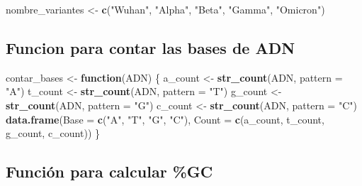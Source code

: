 \documentclass[
]{article}
\newenvironment{Shaded}{\begin{snugshade}}{\end{snugshade}}
\newcommand{\AttributeTok}[1]{\textcolor[rgb]{0.13,0.29,0.53}{#1}}
\newcommand{\ControlFlowTok}[1]{\textcolor[rgb]{0.13,0.29,0.53}{\textbf{#1}}}
\newcommand{\FunctionTok}[1]{\textcolor[rgb]{0.13,0.29,0.53}{\textbf{#1}}}
\newcommand{\NormalTok}[1]{#1}
\newcommand{\OtherTok}[1]{\textcolor[rgb]{0.56,0.35,0.01}{#1}}
\newcommand{\StringTok}[1]{\textcolor[rgb]{0.31,0.60,0.02}{#1}}
\begin{document}
\begin{Shaded}
\begin{Highlighting}[]
\NormalTok{nombre\_variantes }\OtherTok{\textless{}{-}} \FunctionTok{c}\NormalTok{(}\StringTok{"Wuhan"}\NormalTok{, }\StringTok{"Alpha"}\NormalTok{, }\StringTok{"Beta"}\NormalTok{, }\StringTok{"Gamma"}\NormalTok{, }\StringTok{"Omicron"}\NormalTok{)}
\end{Highlighting}
\end{Shaded}

\hypertarget{funcion-para-contar-las-bases-de-adn}{%
\subsection{Funcion para contar las bases de
ADN}\label{funcion-para-contar-las-bases-de-adn}}

\begin{Shaded}
\begin{Highlighting}[]
\NormalTok{contar\_bases }\OtherTok{\textless{}{-}} \ControlFlowTok{function}\NormalTok{(ADN) \{}
\NormalTok{  a\_count }\OtherTok{\textless{}{-}} \FunctionTok{str\_count}\NormalTok{(ADN, }\AttributeTok{pattern =} \StringTok{"A"}\NormalTok{)}
\NormalTok{  t\_count }\OtherTok{\textless{}{-}} \FunctionTok{str\_count}\NormalTok{(ADN, }\AttributeTok{pattern =} \StringTok{"T"}\NormalTok{)}
\NormalTok{  g\_count }\OtherTok{\textless{}{-}} \FunctionTok{str\_count}\NormalTok{(ADN, }\AttributeTok{pattern =} \StringTok{"G"}\NormalTok{)}
\NormalTok{  c\_count }\OtherTok{\textless{}{-}} \FunctionTok{str\_count}\NormalTok{(ADN, }\AttributeTok{pattern =} \StringTok{"C"}\NormalTok{)}
  \FunctionTok{data.frame}\NormalTok{(}\AttributeTok{Base =} \FunctionTok{c}\NormalTok{(}\StringTok{"A"}\NormalTok{, }\StringTok{"T"}\NormalTok{, }\StringTok{"G"}\NormalTok{, }\StringTok{"C"}\NormalTok{), }\AttributeTok{Count =} \FunctionTok{c}\NormalTok{(a\_count, t\_count, g\_count, c\_count))}
\NormalTok{\}}
\end{Highlighting}
\end{Shaded}

\hypertarget{funciuxf3n-para-calcular-gc}{%
\subsection{Función para calcular
\%GC}\label{funciuxf3n-para-calcular-gc}}
\end{document}

